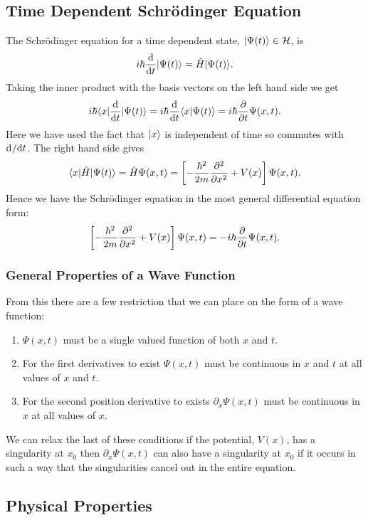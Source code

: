     \subsection{Time Dependent Schr\"odinger Equation}
    The Schr\"odinger equation for a time dependent state, \(\vert {\Psi(t)} \rangle \in \mathcal{H}\), is
    \[i\hbar\dv{t}\vert {\Psi(t)} \rangle = \hat{H}\vert {\Psi(t)} \rangle.\]
    Taking the inner product with the basis vectors on the left hand side we get
    \[i\hbar\langle {x} \vert\dv{t}\vert {\Psi(t)} \rangle = i\hbar\dv{t}\langle {x} \vert {\Psi(t)} \rangle = i\hbar\pdv{t}\Psi(x, t).\]
    Here we have used the fact that \(\vert {x} \rangle\) is independent of time so commutes with \(\mathrm{d}^{}{}/\mathrm{d}{t}^{}\).
    The right hand side gives
    \[\langle {x} \vert\hat{H}\vert {\Psi(t)} \rangle = \hat{H}\Psi(x, t) = \left[-\frac{\hbar^2}{2m}\pdv[2]{x} + V(x)\right]\Psi(x, t).\]
    Hence we have the Schr\"odinger equation in the most general differential equation form:
    \[\left[-\frac{\hbar^2}{2m}\pdv[2]{x} + V(x)\right]\Psi(x, t) = -i\hbar\pdv{t}\Psi(x, t).\]
    
    \subsubsection{General Properties of a Wave Function}
    From this there are a few restriction that we can place on the form of a wave function:
    \begin{enumerate}
        \item \(\Psi(x, t)\) must be a single valued function of both \(x\) and \(t\).
        \item For the first derivatives to exist \(\Psi(x, t)\) must be continuous in \(x\)  and \(t\) at all values of \(x\) and \(t\).
        \item For the second position derivative to exists \(\partial_x\Psi(x, t)\) must be continuous in \(x\) at all values of \(x\).
    \end{enumerate}
    We can relax the last of these conditions if the potential, \(V(x)\), has a singularity at \(x_0\) then \(\partial_x\Psi(x, t)\) can also have a singularity at \(x_0\) if it occurs in such a way that the singularities cancel out in the entire equation.
    
    \subsection{Physical Properties}
